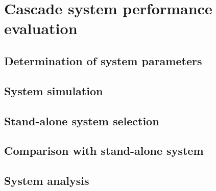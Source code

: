 \chapter{Cascade system performance evaluation}
\section{Determination of system parameters}

\section{System simulation}
\section{Stand-alone system selection}
\section{Comparison with stand-alone system}
\section{System analysis}